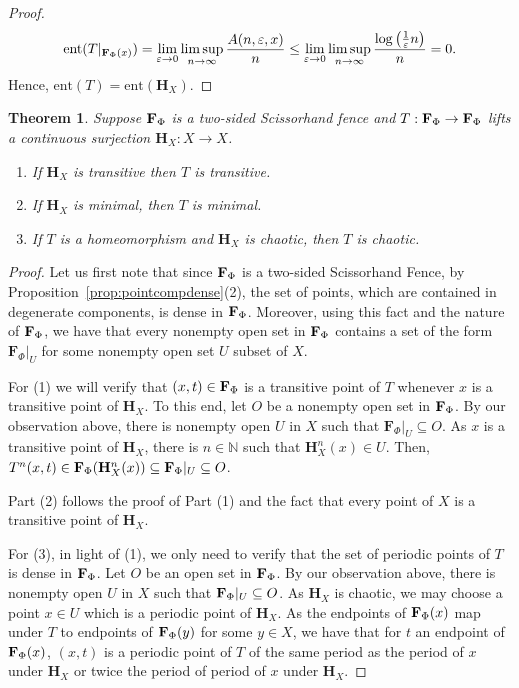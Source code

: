 \documentclass[11pt]{amsart}
\newtheorem{theorem}{Theorem}[section]
\newcommand{\N}{\mathbb{N}}  %
\newcommand{\ent}{\mathrm{ent}}
\newcommand{\fence}{{\bf F}_{\Phi}{}}
\newcommand{\homeocantor}{{\mathbf H}_{X}}
\begin{document}
{\begin{proof}
\[ \ent(T|_{\fence(x)})= \lim_{\varepsilon\to 0}\limsup_{n\to\infty} \frac{A(n,\varepsilon,x)}{n}\leq \lim_{\varepsilon\to 0}\limsup_{n\to\infty} \frac{\log\left(\frac 1{\varepsilon}n\right)}{n}=0.\]
Hence, $\ent(T) = \ent (\homeocantor)$.

\end{proof}
\begin{theorem}\label{thm:GenFraisse}
Suppose $\fence$ is a two-sided Scissorhand fence and $T:\fence \rightarrow \fence$ lifts a continuous surjection $\homeocantor:X \rightarrow X$.

 \begin{enumerate}
 \item If $\homeocantor$ is transitive then $T$ is transitive. 
 \item If $\homeocantor$ is minimal, then $T$ is minimal.
 \item If $T$ is a homeomorphism and  $\homeocantor$ is chaotic, then $T$ is chaotic.
 \end{enumerate}
\end{theorem}

\begin{proof} Let us first note that since $\fence$ is a two-sided Scissorhand Fence, by Proposition~\ref{prop:pointcompdense}(2), the set of points, which are contained in degenerate components, is dense in $\fence$. Moreover, using this fact and the nature of $\fence$, we have that every nonempty open set in $\fence$ contains a set of the form ${\mathbf F}_{\Phi}|_{U}$ for some nonempty open set $U$ subset of  $X$.

For (1) we will verify that $(x,t) \in \fence$ is a  transitive point of $T$ whenever $x$ is a transitive point of $\homeocantor$. To this end, let $O$ be a nonempty open set in $\fence$. By our observation above, there is nonempty open $U$ in $X$ such that  ${\mathbf F}_{\Phi}|_{U} \subseteq O$.  As $x$ is a  transitive point of $\homeocantor$,  there is $n \in \N$ such that $\homeocantor^n(x) \in U$. Then, $T^n(x,t) \in \fence(\homeocantor^n(x)) \subseteq  \fence|_{U} \subseteq O$.

Part (2) follows the proof of Part (1) and the fact that every point of $X$ is a transitive point of $\homeocantor$. 

For (3), in light of (1), we only need to verify that the set of periodic points of $T$ is dense in $\fence$. Let $O$ be an open set in $\fence$. By our observation above, there is nonempty open $U$ in $X$ such that  $\fence|_{U} \subseteq O$. As $\homeocantor$ is chaotic, we may choose a point $x \in U$ which is a periodic point of $\homeocantor$.  As the  endpoints of $\fence(x)$ map under $T$ to  endpoints of $\fence(y)$ for some $y \in X$, we have that for $t$ an endpoint of $\fence(x)$, $(x,t)$ is a periodic point of $T$  of the same period as the period of $x$ under $\homeocantor$ or twice the period of period of $x$ under $\homeocantor$.
\end{proof}


}
\end{document}
